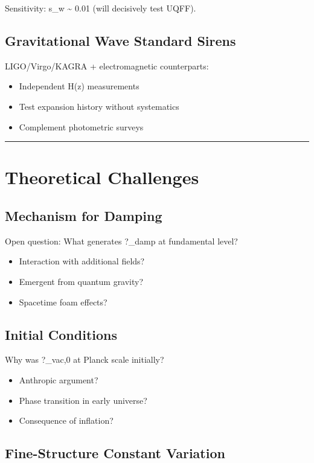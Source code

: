 \documentclass[12pt,a4paper]{article}
\begin{document}
Sensitivity: s\_w \textasciitilde{} 0.01 (will decisively test UQFF).

\subsection{Gravitational Wave Standard Sirens}

LIGO/Virgo/KAGRA + electromagnetic counterparts:

\begin{itemize}
  \item Independent H(z) measurements
  \item Test expansion history without systematics
  \item Complement photometric surveys
\end{itemize}

\medskip\hrule\medskip

\section{Theoretical Challenges}

\subsection{Mechanism for Damping}

Open question: What generates ?\_damp at fundamental level?

\begin{itemize}
  \item Interaction with additional fields?
  \item Emergent from quantum gravity?
  \item Spacetime foam effects?
\end{itemize}

\subsection{Initial Conditions}

Why was ?\_vac,0 at Planck scale initially?

\begin{itemize}
  \item Anthropic argument?
  \item Phase transition in early universe?
  \item Consequence of inflation?
\end{itemize}

\subsection{Fine-Structure Constant Variation}
\end{document}
